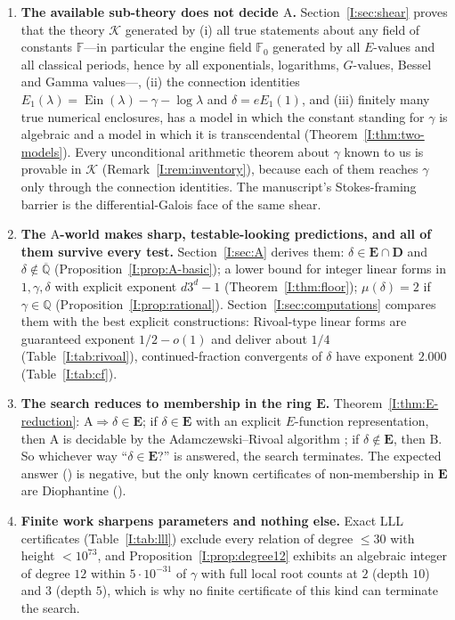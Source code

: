 \documentclass[11pt,a4paper]{article}
\newcommand{\Q}{\mathbb Q}
\newcommand{\Qbar}{\overline{\mathbb Q}}
\newcommand{\Ein}{\operatorname{Ein}}
\newcommand{\EE}{\mathbf E}
\newcommand{\DD}{\mathbf D}
\newcommand{\Fld}{\mathbb F}
\newcommand{\Th}{\mathcal K}
\theoremstyle{definition}
\theoremstyle{remark}
\numberwithin{equation}{section}
\begin{document}
\begin{enumerate}[leftmargin=*]
\item \textbf{The available sub-theory does not decide $\mathrm A$.} Section~\ref{I:sec:shear}
proves that the theory $\Th$ generated by (i) all true statements about any field of
constants $\Fld$---in particular the engine field $\Fld_0$ generated by all $E$-values and
all classical periods, hence by all exponentials, logarithms, $G$-values, Bessel and Gamma
values---, (ii) the connection identities
$E_1(\lambda)=\Ein(\lambda)-\gamma-\log\lambda$ and $\delta=eE_1(1)$, and (iii) finitely
many true numerical enclosures, has a model in which the constant standing for $\gamma$
is algebraic and a model in which it is transcendental (Theorem~\ref{I:thm:two-models}). Every unconditional
arithmetic theorem about $\gamma$ known to us is provable in $\Th$
(Remark~\ref{I:rem:inventory}), because each of them reaches $\gamma$ only through the
connection identities. The manuscript's Stokes-framing barrier
\cite[\S``The Stokes-framing barrier'']{K002} is the differential-Galois face of the same
shear.
\item \textbf{The $\mathrm A$-world makes sharp, testable-looking predictions, and all of
them survive every test.} Section~\ref{I:sec:A} derives them:
$\delta\in\EE\cap\DD$ and $\delta\notin\Qbar$ (Proposition~\ref{I:prop:A-basic});
a lower bound for integer linear forms in $1,\gamma,\delta$ with explicit exponent
$d3^d-1$ (Theorem~\ref{I:thm:floor}); $\mu(\delta)=2$ if $\gamma\in\Q$
(Proposition~\ref{I:prop:rational}). Section~\ref{I:sec:computations} compares them with the
best explicit constructions: Rivoal-type linear forms are guaranteed exponent
$1/2-o(1)$ and deliver about $1/4$ (Table~\ref{I:tab:rivoal}), continued-fraction
convergents of $\delta$ have exponent $2.000$
(Table~\ref{I:tab:cf}).
\item \textbf{The search reduces to membership in the ring $\EE$.}
Theorem~\ref{I:thm:E-reduction}: $\mathrm A\Rightarrow\delta\in\EE$; if $\delta\in\EE$ with an
explicit $E$-function representation, then $\mathrm A$ is decidable by the
Adamczewski--Rivoal algorithm \cite{AR}; if $\delta\notin\EE$, then $\mathrm B$. So whichever
way ``$\delta\in\EE$?'' is answered, the search terminates. The expected answer
(\cite{Rivoal2017}) is negative, but the only known certificates of non-membership in
$\EE$ are Diophantine (\cite[Cor.~1, Cor.~3]{FRliouville}).
\item \textbf{Finite work sharpens parameters and nothing else.} Exact LLL certificates
(Table~\ref{I:tab:lll}) exclude every relation of degree $\le30$ with height $<10^{73}$, and
Proposition~\ref{I:prop:degree12} exhibits an algebraic integer of degree $12$ within
$5\cdot10^{-31}$ of $\gamma$ with full local root counts at $2$ (depth $10$) and $3$
(depth $5$), which is why no finite certificate of this kind can terminate the search.
\end{enumerate}
\end{document}
